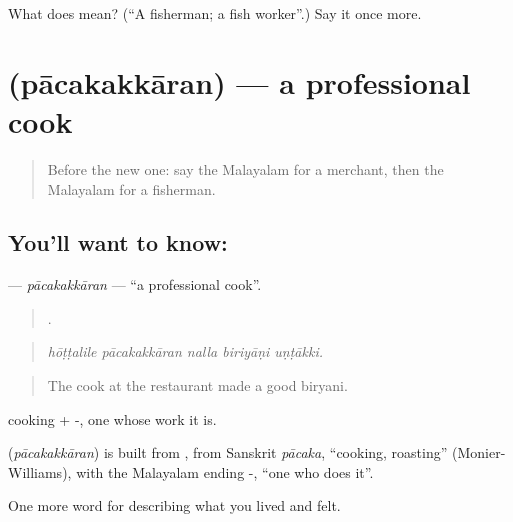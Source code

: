 \begin{tcolorbox}[breakable,colback=teal!4,colframe=teal!35!black,title={Before you move on}]
What does  mean? (\textquotedblleft{}A fisherman; a fish worker\textquotedblright{}.) Say it once more.
\end{tcolorbox}
\section[\texorpdfstring{\ml{പാചകക്കാരൻ} (pācakakkāran)}{പാചകക്കാരൻ (pācakakkāran)}]{ (pācakakkāran) — a professional cook}

\label{lesson:ML-C548-pacakakkaran}



\begin{quote}
Before the new one: say the Malayalam for a merchant, then the Malayalam for a fisherman.
\end{quote}

\subsection*{You'll want to know: }
\textbf{} — \emph{pācakakkāran} — \textquotedblleft{}a professional cook\textquotedblright{}.

\begin{quote}
    .
\end{quote}

\begin{quote}
\emph{hōṭṭalile pācakakkāran nalla biriyāṇi uṇṭākki.}
\end{quote}

\begin{quote}
The cook at the restaurant made a good biryani.
\end{quote}

 cooking + -, one whose work it is.

\begin{cousinweb}
\textbf{} (\emph{pācakakkāran}) is built from , from Sanskrit \emph{pācaka}, \textquotedblleft{}cooking, roasting\textquotedblright{} (Monier-Williams), with the Malayalam ending -, \textquotedblleft{}one who does it\textquotedblright{}.
\end{cousinweb}

\begin{grammarlens}[title={What you've built}]
One more word for describing what you lived and felt.
\end{grammarlens}

